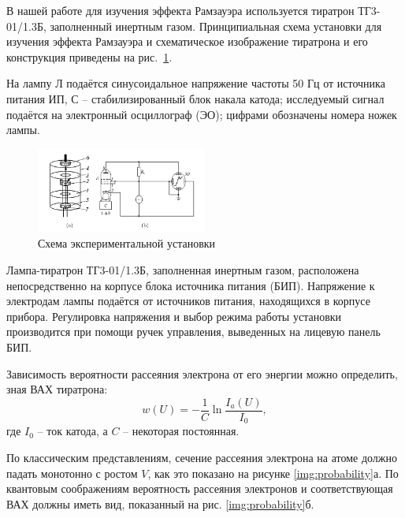 \documentclass[a4paper, 12pt]{article}
\begin{document}
        В нашей работе для изучения эффекта Рамзауэра используется тиратрон ТГ3-01/1.3Б, заполненный инертным газом.
        Принципиальная схема установки для изучения эффекта Рамзауэра и схематическое изображение тиратрона и его конструкция приведены на рис.~\ref{setup1}.

        На лампу Л подаётся синусоидальное напряжение частоты 50 Гц от источника питания ИП,
        С -- стабилизированный блок накала катода; исследуемый сигнал подаётся на электронный осциллограф (ЭО); цифрами обозначены номера ножек лампы.

        \begin{figure}[h!]
            \begin{center}
                \includegraphics[width = 0.5\textwidth]{img/setup.png}
                \caption{Схема экспериментальной установки}
                \label{setup1}
            \end{center}
        \end{figure}

        Лампа-тиратрон ТГ3-01/1.3Б, заполненная инертным газом, расположена непосредственно на корпусе блока источника питания (БИП).
        Напряжение к электродам лампы подаётся от источников питания, находящихся в корпусе прибора.
        Регулировка напряжения и выбор режима работы установки производится при помощи ручек управления, выведенных на лицевую панель БИП.


        Зависимость вероятности рассеяния электрона от его энергии можно определить, зная ВАХ тиратрона:
        \begin{equation}
            \label{eq:w}
            w(U) = -\frac{1}{C}\ln \frac{I_a(U)}{I_0},
        \end{equation}
        где $I_0$ -- ток катода, а $C$ -- некоторая постоянная.

        По классическим представлениям, сечение рассеяния электрона на атоме должно падать монотонно с ростом $V$, как это показано на рисунке \ref{img:probability}а. По квантовым соображениям вероятность рассеяния электронов и соответствующая ВАХ должны иметь вид, показанный на рис. \ref{img:probability}б.
\end{document}
